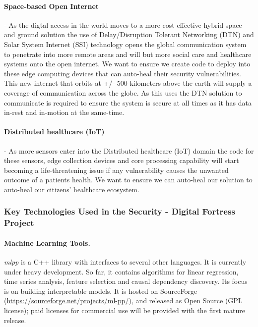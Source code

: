 \documentclass[a4paper,11pt]{article}
\newcommand{\project}[1]{\textbf{#1}\xspace}
\newcommand{\SECURITY}{\project{Security - Digital Fortress}}
\newcommand{\TheProject}{\SECURITY}
\begin{document}
\paragraph{Space-based Open Internet}
\label{sec:spacenet}
- As the digtal access in the world moves to a more cost effective hybrid space and ground solution the use of Delay/Disruption Tolerant Networking (DTN) and Solar System Internet (SSI) technology opens the global communication system to penetrate into more remote areas and will but more social care and healthcare systems onto the open internet. We want to ensure we create code to deploy into these edge computing devices that can auto-heal their security vulnerabilities. This new internet that orbits at +/- 500 kilometers above the earth will supply a coverage of communication across the globe. As this uses the DTN solution to communicate is required to ensure the system is secure at all times as it has data in-rest and in-motion at the same-time.

\paragraph{Distributed healthcare (IoT)}
\label{sec:health:IoT}
- As more sensors enter into the Distributed healthcare (IoT) domain the code for these sensors, edge collection devices and core processing capability will start becoming a life-threatening issue if any vulnerability causes the unwanted outcome of a patients health. We want to ensure we can auto-heal our solution to auto-heal our citizens' healthcare ecosystem.

\subsubsection{Key Technologies Used in the \TheProject{} Project}
\label{sect:key-technologies}

\paragraph{\SCCHshort{} Machine Learning Tools.}
\label{sec:mlpp}
\emph{mlpp} is a C++ library with interfaces to several other languages. It 
is currently under heavy development. So far, it contains algorithms for 
linear regression, time series analysis, feature selection and causal 
dependency discovery. Its focus is on building interpretable models. It is hosted 
on SourceForge (\url{https://sourceforge.net/projects/ml-pp/}), and released 
as Open Source (GPL license); paid licenses for commercial use will be provided
with the first mature release.
\end{document}
